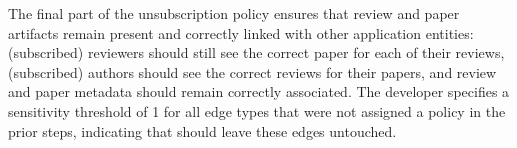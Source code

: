 
The final part of the unsubscription policy ensures that review and paper artifacts remain present
and correctly linked with other application entities: (subscribed) reviewers should still see the
correct paper for each of their reviews, (subscribed) authors should see the correct reviews for
their papers, and review and paper metadata should remain correctly associated. The developer
specifies a sensitivity threshold of 1 for all edge types that were not assigned a policy in the
prior steps, indicating that \sys should leave these edges untouched.


